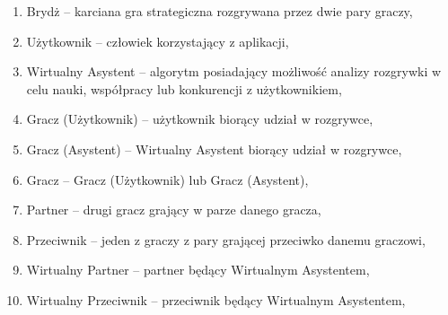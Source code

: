 \begin{enumerate}
  \item Brydż -- karciana gra strategiczna rozgrywana przez dwie pary graczy,
  \item Użytkownik -- człowiek korzystający z aplikacji,
  \item Wirtualny Asystent -- algorytm posiadający możliwość analizy rozgrywki w celu nauki, współpracy lub konkurencji z użytkownikiem,
  \item Gracz (Użytkownik) -- użytkownik biorący udział w rozgrywce,
  \item Gracz (Asystent) -- Wirtualny Asystent biorący udział w rozgrywce,
  \item Gracz -- Gracz (Użytkownik) lub Gracz (Asystent),
  \item Partner -- drugi gracz grający w parze danego gracza,
  \item Przeciwnik -- jeden z graczy z pary grającej przeciwko danemu graczowi,
  \item Wirtualny Partner -- partner będący Wirtualnym Asystentem,
  \item Wirtualny Przeciwnik -- przeciwnik będący Wirtualnym Asystentem,
\end{enumerate}
